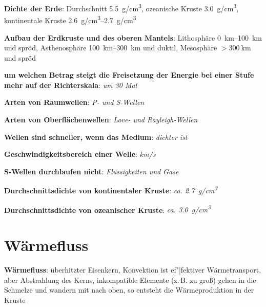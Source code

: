 \textbf{Dichte der Erde}:
Durchschnitt \SI{5.5}{\gram/\centi\meter\cubed},
ozeanische Kruste \SI{3.0}{\gram/\centi\meter\cubed},
kontinentale Kruste \SIrange{2.6}{2.7}{\gram/\centi\meter\cubed}

\textbf{Aufbau der Erdkruste und des oberen Mantels}:
Lithosphäre \SIrange{0}{100}{\kilo\meter} und spröd,
Asthenosphäre \SIrange{100}{300}{\kilo\meter} und duktil,
Mesosphäre $> \SI{300}{\kilo\meter}$ und spröd

\begin{wichtig}
    \item
    \textbf{um welchen Betrag steigt die Freisetzung der Energie bei einer Stufe mehr
    auf der Richterskala}:
    \emph{um 30 Mal}

    \item
    \textbf{Arten von Raumwellen}:
    \emph{P- und S-Wellen}

    \item
    \textbf{Arten von Oberflächenwellen}:
    \emph{Love- und Rayleigh-Wellen}

    \item
    \textbf{Wellen sind schneller, wenn das Medium}:
    \emph{dichter ist}

    \item
    \textbf{Geschwindigkeitsbereich einer Welle}:
    \emph{\si[math-rm=\mathit,text-rm=\itshape]{\kilo\meter/\second}}

    \item
    \textbf{S-Wellen durchlaufen nicht}:
    \emph{Flüssigkeiten und Gase}

    \item
    \textbf{Durchschnittsdichte von kontinentaler Kruste}:
    \emph{ca. \SI[math-rm=\mathit,text-rm=\itshape]{2.7}{\gram/\centi\meter^3}}

    \item
    \textbf{Durchschnittsdichte von ozeanischer Kruste}:
    \emph{ca. \SI[math-rm=\mathit,text-rm=\itshape]{3.0}{\gram/\centi\meter^3}}
\end{wichtig}

\pagebreak

\section{%
    Wärmefluss%
}

\textbf{Wärmefluss}:
überhitzter Eisenkern,
Konvektion ist ef"|fektiver Wärmetransport,
aber Abstrahlung des Kerns,
inkompatible Elemente (z.\,B. zu groß) gehen in die Schmelze und wandern mit nach oben,
so entsteht die Wärmeproduktion in der Kruste

